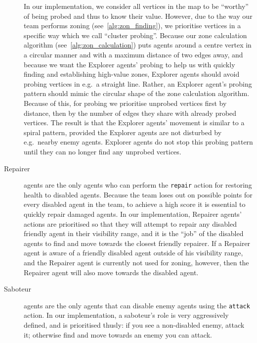 \begin{description}
        In our implementation, we consider all vertices in the map to be \enquote{worthy} of being probed and thus to know their value.
        However, due to the way our team performs zoning (see~\autoref{alg:zon_finding}), we prioritise vertices in a specific way which we call \enquote{cluster probing}.
        Because our zone calculation algorithm (see~\autoref{alg:zon_calculation}) puts agents around a centre vertex in a circular manner and with a maximum distance of two edges away, and because we want the Explorer agents' probing to help us with quickly finding and establishing high-value zones, Explorer agents should avoid probing vertices in e.g.\ a straight line.
        Rather, an Explorer agent's probing pattern should mimic the circular shape of the zone calculation algorithm.
        Because of this, for probing we prioritise unprobed vertices first by distance, then by the number of edges they share with already probed vertices.
        The result is that the Explorer agents' movement is similar to a spiral pattern, provided the Explorer agents are not disturbed by e.g.\ nearby enemy agents.
        Explorer agents do not stop this probing pattern until they can no longer find any unprobed vertices.
    \item[Repairer] agents are the only agents who can perform the \texttt{repair} action for restoring health to disabled agents.
        Because the team loses out on possible points for every disabled agent in the team, to achieve a high score it is essential to quickly repair damaged agents.
        In our implementation, Repairer agents' actions are prioritised so that they will attempt to repair any disabled friendly agent in their visibility range, and it is the \enquote{job} of the disabled agents to find and move towards the closest friendly repairer.
        If a Repairer agent is aware of a friendly disabled agent outside of his visibility range, and the Repairer agent is currently not used for zoning, however, then the Repairer agent will also move towards the disabled agent.
    \item[Saboteur] agents are the only agents that can disable enemy agents using the \texttt{attack} action.
        In our implementation, a saboteur's role is very aggressively defined, and is prioritised thusly: if you see a non-disabled enemy, attack it; otherwise find and move towards an enemy you can attack.


\end{description}

